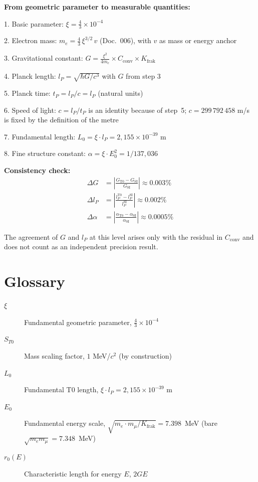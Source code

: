 	\begin{derivation}
		\textbf{From geometric parameter to measurable quantities:}
		
		1. Basic parameter: $\xi = \frac{4}{3} \times 10^{-4}$
		
		2. Electron mass: $m_e = \frac{4}{3}\,\xi^{3/2}\,v$ (Doc.~006), with $v$ as mass or energy anchor
		
		3. Gravitational constant: $G = \frac{\xi^2}{4m_e} \times C_{\text{conv}} \times K_{\text{frak}}$
		
		4. Planck length: $l_P = \sqrt{\hbar G/c^3}$ with $G$ from step 3
		
		5. Planck time: $t_P = l_P/c = l_P$ (natural units)
		
		6. Speed of light: $c = l_P/t_P$ is an identity because of step~5; $c = 299\,792\,458$ m/s is fixed by the definition of the metre
		
		7. Fundamental length: $L_0 = \xi \cdot l_P = 2{,}155 \times 10^{-39}$ m
		
		8. Fine structure constant: $\alpha = \xi \cdot E_0^2 = 1/137{,}036$
		
		\textbf{Consistency check:}
		\begin{align}
			\Delta G &= \left|\frac{G_{\text{T0}} - G_{\text{SI}}}{G_{\text{SI}}}\right| \approx 0.003\% \\
			\Delta l_P &= \left|\frac{l_P^{\text{T0}} - l_P^{\text{SI}}}{l_P^{\text{SI}}}\right| \approx 0.002\% \\
			\Delta \alpha &= \left|\frac{\alpha_{\text{T0}} - \alpha_{\text{SI}}}{\alpha_{\text{SI}}}\right| \approx 0.0005\%
		\end{align}
		
		The agreement of $G$ and $l_P$ at this level arises only with the residual in $C_{\text{conv}}$ and does not count as an independent precision result.
		
	\end{derivation}
	
	\section*{Glossary}
	
	\begin{description}
		\item[$\xi$] Fundamental geometric parameter, $\frac{4}{3} \times 10^{-4}$
		\item[$S_{T0}$] Mass scaling factor, $1$ MeV/$c^2$ (by construction)
		\item[$L_0$] Fundamental T0 length, $\xi \cdot l_P = 2{,}155 \times 10^{-39}$ m
		\item[$E_0$] Fundamental energy scale, $\sqrt{m_e \cdot m_\mu/K_{\text{frak}}} = 7.398$~MeV (bare $\sqrt{m_e m_\mu} = 7.348$~MeV)
		\item[$r_0(E)$] Characteristic length for energy $E$, $2GE$
	\end{description}
	
